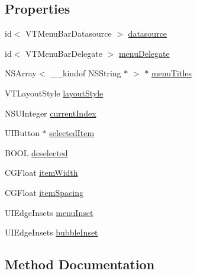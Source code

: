 \subsection*{Properties}
\begin{DoxyCompactItemize}
\item 
id$<$ V\+T\+Menu\+Bar\+Datasource $>$ \mbox{\hyperlink{interface_v_t_menu_bar_a889bd0a2cc7dc333e453017757df2e5b}{datasource}}
\item 
id$<$ V\+T\+Menu\+Bar\+Delegate $>$ \mbox{\hyperlink{interface_v_t_menu_bar_a6b6e0d774f05f267be75588b6d4bf17d}{menu\+Delegate}}
\item 
N\+S\+Array$<$ \+\_\+\+\_\+kindof N\+S\+String $\ast$ $>$ $\ast$ \mbox{\hyperlink{interface_v_t_menu_bar_ac9624e7f9d49556536dba5ded9f34bb7}{menu\+Titles}}
\item 
V\+T\+Layout\+Style \mbox{\hyperlink{interface_v_t_menu_bar_a5d7a4448fb69c18aefa0b55bc7f9a14d}{layout\+Style}}
\item 
N\+S\+U\+Integer \mbox{\hyperlink{interface_v_t_menu_bar_accfcd8fcf4c1cec8833a2b52434620d8}{current\+Index}}
\item 
U\+I\+Button $\ast$ \mbox{\hyperlink{interface_v_t_menu_bar_aea3a7836dca15ffdca068c2d59dfe56e}{selected\+Item}}
\item 
B\+O\+OL \mbox{\hyperlink{interface_v_t_menu_bar_a4e587c36d84c2faf18f99463de7ae59a}{deselected}}
\item 
C\+G\+Float \mbox{\hyperlink{interface_v_t_menu_bar_a4351f7057040971383a69fec463a495b}{item\+Width}}
\item 
C\+G\+Float \mbox{\hyperlink{interface_v_t_menu_bar_a427061ebad7fd420b45c5b512595ea21}{item\+Spacing}}
\item 
U\+I\+Edge\+Insets \mbox{\hyperlink{interface_v_t_menu_bar_aa72884e3a2219decce612d4863e350e2}{menu\+Inset}}
\item 
U\+I\+Edge\+Insets \mbox{\hyperlink{interface_v_t_menu_bar_a8d3ab34f5c377b0db8f09fb0d569e752}{bubble\+Inset}}
\end{DoxyCompactItemize}


\subsection{Method Documentation}
\mbox{\label{interface_v_t_menu_bar_a917d8914840aa425cd46b272b80854a8}} 
